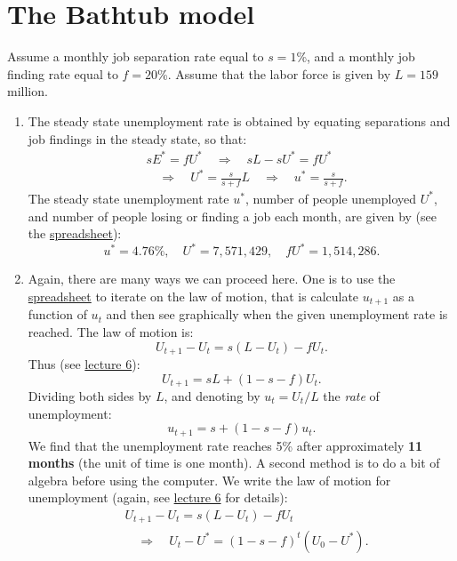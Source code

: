 \documentclass[]{book}
\theoremstyle{definition}
\theoremstyle{definition}
\theoremstyle{definition}
\theoremstyle{remark}
\begin{document}
\section{The Bathtub model}\label{the-bathtub-model-1}

Assume a monthly job separation rate equal to \(s=1\)\%, and a monthly
job finding rate equal to \(f=20\)\%. Assume that the labor force is
given by \(L=159\) million.

\begin{enumerate}
\def\labelenumi{\arabic{enumi}.}
\item
  The steady state unemployment rate is obtained by equating separations
  and job findings in the steady state, so that: \[
  \begin{aligned}
  &s E^{*} = f U^{*} \quad \Rightarrow \quad sL - s U^{*} = fU^{*}\\
  &\quad \Rightarrow \quad U^{*}=\frac{s}{s+f}L \quad \Rightarrow \quad u^{*}=\frac{s}{s+f}.
  \end{aligned}
  \] The steady state unemployment rate \(u^{*}\), number of people
  unemployed \(U^{*}\), and number of people losing or finding a job
  each month, are given by (see the
  \href{https://docs.google.com/spreadsheets/d/1h9JJD8K2_IE166gdj78waf0zu4YDY9Rp3r5oiJR_06s/edit?usp=sharing}{spreadsheet}):
  \[u^{*}=4.76\%, \quad U^{*}=7,571,429, \quad f U^{*} = 1,514,286.\]
\item
  Again, there are many ways we can proceed here. One is to use the
  \href{https://docs.google.com/spreadsheets/d/1h9JJD8K2_IE166gdj78waf0zu4YDY9Rp3r5oiJR_06s/edit?usp=sharing}{spreadsheet}
  to iterate on the law of motion, that is calculate \(u_{t+1}\) as a
  function of \(u_t\) and then see graphically when the given
  unemployment rate is reached. The law of motion is:
  \[U_{t+1}-U_t = s(L-U_t) -f U_t.\] Thus (see
  \protect\hyperlink{labor-market}{lecture 6}):
  \[U_{t+1}=sL + \left(1-s-f\right)U_t.\] Dividing both sides by \(L\),
  and denoting by \(u_{t}=U_t/L\) the \emph{rate} of unemployment:
  \[u_{t+1}=s+\left(1-s-f\right)u_t.\] We find that the unemployment
  rate reaches 5\% after approximately \textbf{11 months} (the unit of
  time is one month). A second method is to do a bit of algebra before
  using the computer. We write the law of motion for unemployment
  (again, see \protect\hyperlink{labor-market}{lecture 6} for details):
  \[\begin{aligned}
  &U_{t+1}-U_t = s(L-U_t) -f U_t \\
  & \quad \Rightarrow \quad U_{t}-U^{*}=(1-s-f)^t\left(U_0-U^{*}\right).

\end{aligned}\]
\end{enumerate}
\end{document}
